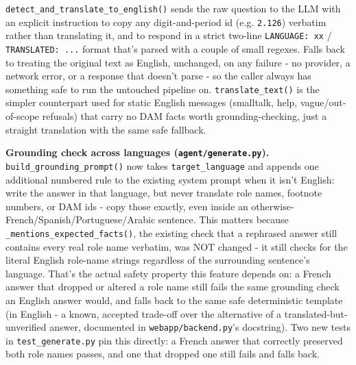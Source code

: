\texttt{detect\_\allowbreak{}and\_\allowbreak{}translate\_\allowbreak{}to\_\allowbreak{}english()} sends the raw question to the LLM with an explicit instruction to copy any digit-and-period id (e.g. \texttt{2.126}) verbatim rather than translating it, and to respond in a strict two-line \texttt{LANGUAGE: xx} / \texttt{TRANSLATED: ...} format that's parsed with a couple of small regexes. Falls back to treating the original text as English, unchanged, on any failure - no provider, a network error, or a response that doesn't parse - so the caller always has something safe to run the untouched pipeline on. \texttt{translate\_\allowbreak{}text()} is the simpler counterpart used for static English messages (smalltalk, help, vague/out-of-scope refusals) that carry no DAM facts worth grounding-checking, just a straight translation with the same safe fallback.

\textbf{Grounding check across languages (\texttt{agent/\allowbreak{}generate.py}).} \texttt{build\_\allowbreak{}grounding\_\allowbreak{}prompt()} now takes \texttt{target\_\allowbreak{}language} and appends one additional numbered rule to the existing system prompt when it isn't English: write the answer in that language, but never translate role names, footnote numbers, or DAM ids - copy those exactly, even inside an otherwise-French/Spanish/Portuguese/Arabic sentence. This matters because \texttt{\_\allowbreak{}mentions\_\allowbreak{}expected\_\allowbreak{}facts()}, the existing check that a rephrased answer still contains every real role name verbatim, was NOT changed - it still checks for the literal English role-name strings regardless of the surrounding sentence's language. That's the actual safety property this feature depends on: a French answer that dropped or altered a role name still fails the same grounding check an English answer would, and falls back to the same safe deterministic template (in English - a known, accepted trade-off over the alternative of a translated-but-unverified answer, documented in \texttt{webapp/\allowbreak{}backend.py}'s docstring). Two new tests in \texttt{test\_\allowbreak{}generate.py} pin this directly: a French answer that correctly preserved both role names passes, and one that dropped one still fails and falls back.

